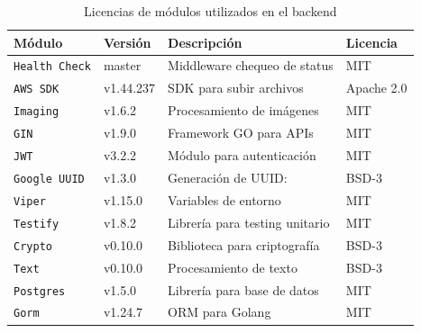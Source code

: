 \begin{table}[H]
\centering
\begin{tabular}{llll}
\toprule
Módulo                     & Versión       & Descripción        & Licencia                    \\
\midrule
\texttt{Health Check}       & master & Middleware chequeo de status & MIT               \\
\texttt{AWS SDK }       & v1.44.237 & SDK para subir archivos & Apache 2.0               \\
\texttt{Imaging }       & v1.6.2 & Procesamiento de imágenes & MIT               \\
\texttt{GIN }       & v1.9.0 & Framework GO para APIs & MIT               \\
\texttt{JWT }       & v3.2.2 & Módulo para autenticación & MIT               \\
\texttt{Google UUID}       & v1.3.0 & Generación de UUID:  & BSD-3              \\
\texttt{Viper }       & v1.15.0 & Variables de entorno & MIT   \\     
\texttt{Testify}       & v1.8.2 & Librería para testing unitario & MIT   \\    
\texttt{Crypto}       & v0.10.0 & Biblioteca para criptografía   & BSD-3  \\    
\texttt{Text}       & v0.10.0 & Procesamiento de texto  & BSD-3  \\    
\texttt{Postgres}       & v1.5.0 & Librería para base de datos  & MIT  \\  
\texttt{Gorm}       & v1.24.7 & ORM para Golang  & MIT  \\  
\bottomrule
\end{tabular}
\caption{Licencias de módulos utilizados en el backend}
\label{tab:backend-modulo}
\end{table}


